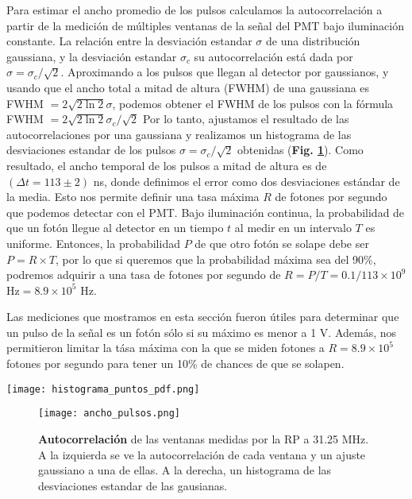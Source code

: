 Para estimar el ancho promedio de los pulsos calculamos la autocorrelación a partir de la medición de múltiples ventanas de la señal del PMT bajo iluminación constante.
La relación entre la desviación estandar $\sigma$ de una distribución gaussiana, y la desviación estandar $\sigma_c$ su autocorrelación está dada por $\sigma = \sigma_c/\sqrt{2}$.
Aproximando a los pulsos que llegan al detector por gaussianos, y usando que el ancho total a mitad de altura (FWHM) de una gaussiana es FWHM $= 2 \sqrt{2 \ln{2}}\sigma$, podemos obtener el FWHM de los pulsos con la fórmula FWHM $= 2 \sqrt{2 \ln{2}}\sigma_c / \sqrt{2}$
Por lo tanto, ajustamos el resultado de las autocorrelaciones por una gaussiana y realizamos un histograma de las desviaciones estandar de los pulsos $\sigma = \sigma_c / \sqrt{2}$ obtenidas (\textbf{Fig. \ref{fig:ancho_pulsos}}).
Como resultado, el ancho temporal de los pulsos a mitad de altura es de $(\Delta t = 113 \pm 2)$ ns, donde definimos el error como dos desviaciones estándar de la media.
Esto nos permite definir una tasa máxima $R$ de fotones por segundo que podemos detectar con el PMT.
Bajo iluminación continua, la probabilidad de que un fotón llegue al detector en un tiempo $t$ al medir en un intervalo $T$ es uniforme.
Entonces, la probabilidad $P$ de que otro fotón se solape debe ser $P = R \times T$, por lo que si queremos que la probabilidad máxima sea del 90\%, podremos adquirir a una tasa de fotones por segundo de $R = P/T = 0.1/113 \times 10^9$ Hz$ = 8.9 \times 10^5$ Hz.

Las mediciones que mostramos en esta sección fueron útiles para determinar que un pulso de la señal es un fotón sólo si su máximo es menor a 1 V.
Además, nos permitieron limitar la tása máxima con la que se miden fotones a $R = 8.9 \times 10^5$ fotones por segundo para tener un 10\% de chances de que se solapen.

\begin{SCfigure}
    \centering
    \texttt{[image: histograma\_puntos\_pdf.png]}
    \caption{\textbf{Histograma de voltajes} de una señal del PMT tomada con la RP a 31.25 MHz. El eje vertical está en escala logarítmica.}
    \label{fig:histograma_puntos}
\end{SCfigure}


\begin{figure}
    \texttt{[image: ancho\_pulsos.png]}
    \caption{\textbf{Autocorrelación} de las ventanas medidas por la RP a 31.25 MHz. A la izquierda se ve la autocorrelación de cada ventana y un ajuste gaussiano a una de ellas. A la derecha, un histograma de las desviaciones estandar de las gausianas.}
    \label{fig:ancho_pulsos}
\end{figure}

